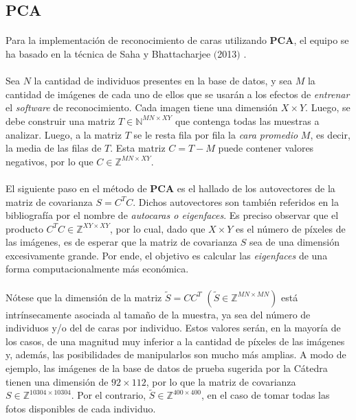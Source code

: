 \documentclass[12pt, twocolumn]{article}
\begin{document}
	\subsection{PCA}
	
	\paragraph{} Para la implementación de reconocimiento de caras utilizando \textbf{PCA}, el equipo se ha basado en la técnica de Saha y Bhattacharjee $($2013$)$ \cite{PCA}.
	
	\paragraph{} Sea $N$ la cantidad de individuos presentes en la base de datos, y sea $M$ la cantidad de imágenes de cada uno de ellos que se usarán a los efectos de \textit{entrenar} el \textit{software} de reconocimiento. Cada imagen tiene una dimensión $X\times Y$. Luego, se debe construir una matriz $T \in \mathbb{N}^{MN\times XY}$ que contenga todas las muestras a analizar. Luego, a la matriz $T$ se le resta fila por fila la \textit{cara promedio} $M$, es decir, la media de las filas de $T$. Esta matriz $C = T - M$ puede contener valores negativos, por lo que $C \in \mathbb{Z}^{MN\times XY}$.
	
	\paragraph{} El siguiente paso en el método de \textbf{PCA} es el hallado de los autovectores de la matriz de covarianza $S = C^{T}C$. Dichos autovectores son también referidos en la bibliografía por el nombre de \textit{autocaras o eigenfaces}. Es preciso observar que el producto $C^{T}C \in \mathbb{Z}^{XY\times XY}$, por lo cual, dado que $X\times Y$ es el número de píxeles de las imágenes, es de esperar que la matriz de covarianza $S$ sea de una dimensión excesivamente grande. Por ende, el objetivo es calcular las \textit{eigenfaces} de una forma computacionalmente más económica.
	
	\paragraph{} Nótese que la dimensión de la matriz $\widetilde{S} = CC^{T}$  $(\widetilde{S} \in \mathbb{Z}^{MN \times MN})$ está intrínsecamente asociada al tamaño de la muestra, ya sea del número de individuos y/o del de caras por individuo. Estos valores serán, en la mayoría de los casos, de una magnitud muy inferior a la cantidad de píxeles de las imágenes y, además, las posibilidades de manipularlos son mucho más amplias. A modo de ejemplo, las imágenes de la base de datos de prueba sugerida por la Cátedra \cite{dbf} tienen una dimensión de $92 \times 112$, por lo que la matriz de covarianza $S \in \mathbb{Z}^{10304\times 10304}$. Por el contrario, $\widetilde{S} \in \mathbb{Z}^{400 \times 400}$, en el caso de tomar todas las fotos disponibles de cada individuo.
	
\end{document}
